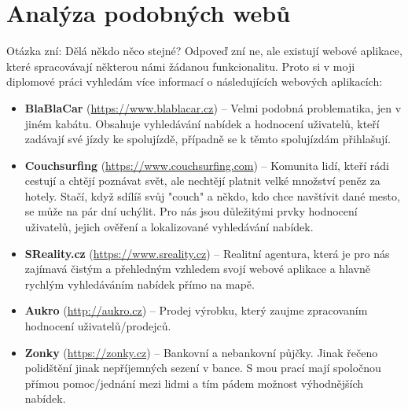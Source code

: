 \chapter{Analýza podobných webů}

Otázka zní: Dělá někdo něco stejné? Odpoveď zní ne, ale existují webové aplikace, které spracovávají některou námi žádanou funkcionalitu. Proto si v moji diplomové práci vyhledám více informací o následujících webových aplikacích:
\begin{itemize}
	\item \textbf{BlaBlaCar} (\url{https://www.blablacar.cz}) – Velmi podobná problematika, jen v jiném kabátu. Obsahuje vyhledávání nabídek a hodnocení uživatelů, kteří zadávají své jízdy ke spolujízdě, případně se k těmto spolujízdám přihlašují.

	\item \textbf{Couchsurfing} (\url{https://www.couchsurfing.com}) – Komunita lidí, kteří rádi cestují a chtějí poznávat svět, ale nechtějí platnit velké množství peněz za hotely. Stačí, když sdílíš svůj "couch" a někdo, kdo chce navštívit dané mesto, se může na pár dní uchýlit. Pro nás jsou důležitými prvky hodnocení uživatelů, jejich ověření a lokalizované vyhledávání nabídek.

	\item \textbf{SReality.cz} (\url{https://www.sreality.cz}) – Realitní agentura, která je pro nás zajímavá čistým a přehledným vzhledem svojí webové aplikace a hlavně rychlým vyhledáváním nabídek přímo na mapě.

	\item \textbf{Aukro} (\url{http://aukro.cz}) – Prodej výrobku, který zaujme zpracovaním hodnocení uživatelů/prodejců.

	\item \textbf{Zonky} (\url{https://zonky.cz}) – Bankovní a nebankovní půjčky. Jinak řečeno polidštění jinak nepříjemných sezení v bance. S mou prací mají spoločnou přímou pomoc/jednání mezi lidmi a tím pádem možnost výhodnějších nabídek.
\end{itemize}

\newpage

\newpage

\newpage

\newpage

\newpage

